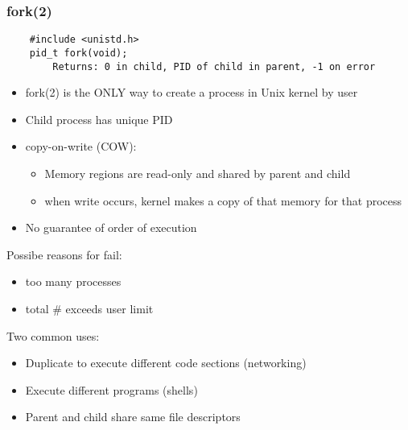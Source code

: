 \documentclass[10pt]{article}
\begin{document}
\begin{multicols}{2}
\begin{minipage}{\columnwidth}
        \subsubsection*{fork(2)}
        \begin{lstlisting}
    #include <unistd.h>
    pid_t fork(void);
        Returns: 0 in child, PID of child in parent, -1 on error
        \end{lstlisting}
        \begin{itemize}
            \setlength{\itemsep}{0em}
            \item fork(2) is the ONLY way to create a process in Unix kernel by user
            \item Child process has unique PID
            \item copy-on-write (COW):
                  \begin{itemize}
                      \item Memory regions are read-only and shared by parent and child
                      \item when write occurs, kernel makes a copy of that memory for that process
                  \end{itemize}
            \item No guarantee of order of execution
        \end{itemize}
        \begin{minipage}{0.4\columnwidth}
            Possibe reasons for fail:
            \begin{itemize}
                \item too many processes
                \item total \# exceeds user limit
            \end{itemize}
        \end{minipage}
        \begin{minipage}{0.5\columnwidth}
            Two common uses:
            \begin{itemize}
                \item Duplicate to execute different code sections (networking)
                \item Execute different programs (shells)
            \end{itemize}
        \end{minipage}
        \begin{itemize}
            \setlength{\itemsep}{0em}
            \item Parent and child share same file descriptors

\end{itemize}
\end{minipage}
\end{multicols}
\end{document}
